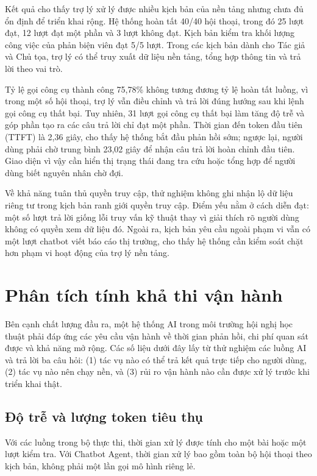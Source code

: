 Kết quả cho thấy trợ lý xử lý được nhiều kịch bản của nền tảng nhưng chưa đủ ổn định để triển khai rộng. Hệ thống hoàn tất 40/40 hội thoại, trong đó 25 lượt đạt, 12 lượt đạt một phần và 3 lượt không đạt. Kịch bản kiểm tra khối lượng công việc của phản biện viên đạt 5/5 lượt. Trong các kịch bản dành cho Tác giả và Chủ tọa, trợ lý có thể truy xuất dữ liệu nền tảng, tổng hợp thông tin và trả lời theo vai trò.

Tỷ lệ gọi công cụ thành công 75,78\% không tương đương tỷ lệ hoàn tất luồng, vì trong một số hội thoại, trợ lý vẫn điều chỉnh và trả lời đúng hướng sau khi lệnh gọi công cụ thất bại. Tuy nhiên, 31 lượt gọi công cụ thất bại làm tăng độ trễ và góp phần tạo ra các câu trả lời chỉ đạt một phần. Thời gian đến token đầu tiên (TTFT) là 2,36 giây, cho thấy hệ thống bắt đầu phản hồi sớm; ngược lại, người dùng phải chờ trung bình 23,02 giây để nhận câu trả lời hoàn chỉnh đầu tiên. Giao diện vì vậy cần hiển thị trạng thái đang tra cứu hoặc tổng hợp để người dùng biết nguyên nhân chờ đợi.

Về khả năng tuân thủ quyền truy cập, thử nghiệm không ghi nhận lộ dữ liệu riêng tư trong kịch bản ranh giới quyền truy cập. Điểm yếu nằm ở cách diễn đạt: một số lượt trả lời giống lỗi truy vấn kỹ thuật thay vì giải thích rõ người dùng không có quyền xem dữ liệu đó. Ngoài ra, kịch bản yêu cầu ngoài phạm vi vẫn có một lượt chatbot viết báo cáo thị trường, cho thấy hệ thống cần kiểm soát chặt hơn phạm vi hoạt động của trợ lý nền tảng.

\section{Phân tích tính khả thi vận hành}

Bên cạnh chất lượng đầu ra, một hệ thống AI trong môi trường hội nghị học thuật phải đáp ứng các yêu cầu vận hành về thời gian phản hồi, chi phí quan sát được và khả năng mở rộng. Các số liệu dưới đây lấy từ thử nghiệm các luồng AI và trả lời ba câu hỏi: (1) tác vụ nào có thể trả kết quả trực tiếp cho người dùng, (2) tác vụ nào nên chạy nền, và (3) rủi ro vận hành nào cần được xử lý trước khi triển khai thật.

\subsection{Độ trễ và lượng token tiêu thụ}

Với các luồng trong bộ thực thi, thời gian xử lý được tính cho một bài hoặc một lượt kiểm tra. Với Chatbot Agent, thời gian xử lý bao gồm toàn bộ hội thoại theo kịch bản, không phải một lần gọi mô hình riêng lẻ.


